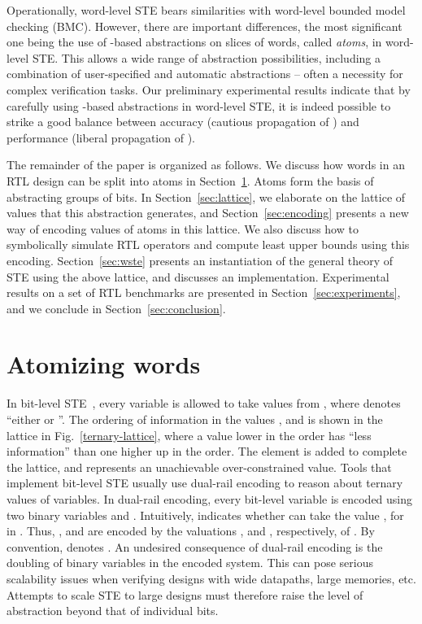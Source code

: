 \documentclass{llncs}
\begin{document}
Operationally, word-level STE bears similarities with word-level
bounded model checking (BMC).  However, there are important
differences, the most significant one being the use of -based
abstractions on slices of words, called \emph{atoms}, in word-level
STE.  This allows a wide range of abstraction possibilities, including
a combination of user-specified and automatic abstractions -- often a
necessity for complex verification tasks.  Our preliminary
experimental results indicate that by carefully using -based
abstractions in word-level STE, it is indeed possible to strike a good
balance between accuracy (cautious propagation of ) and performance
(liberal propagation of ).

The remainder of the paper is organized as follows.  We discuss how
words in an RTL design can be split into atoms in
Section~\ref{sec:atomization}.  Atoms form the basis of abstracting
groups of bits.  In Section~\ref{sec:lattice}, we elaborate on the
lattice of values that this abstraction generates, and
Section~\ref{sec:encoding} presents a new way of encoding values of
atoms in this lattice.  We also discuss how to symbolically simulate
RTL operators and compute least upper bounds using this encoding.
Section~\ref{sec:wste} presents an instantiation of the general theory
of STE using the above lattice, and discusses an implementation.
Experimental results on a set of RTL benchmarks are presented in
Section~\ref{sec:experiments}, and we conclude in
Section~\ref{sec:conclusion}.

\section{Atomizing words}\label{sec:atomization}
In bit-level STE~\cite{BryantSeger90,SegerJOMABS05}, every variable is
allowed to take values from , where  denotes ``either
 or ''.  The ordering of information in the values ,  and
 is shown in the lattice in Fig.~\ref{ternary-lattice}, where a
value lower in the order has ``less information'' than one higher up
in the order.  The element  is added to complete the lattice,
and represents an unachievable over-constrained value.  Tools that
implement bit-level STE usually use dual-rail encoding to reason about
ternary values of variables.  In dual-rail encoding, every bit-level
variable  is encoded using two binary variables  and .
Intuitively,  indicates whether  can take the value , for
 in .  Thus, ,  and  are encoded by the
valuations ,  and , respectively, of .  By convention,  denotes .  An
undesired consequence of dual-rail encoding is the doubling of binary
variables in the encoded system.  This can pose serious scalability
issues when verifying designs with wide datapaths, large memories,
etc.  Attempts to scale STE to large designs must therefore raise the
level of abstraction beyond that of individual bits.
\end{document}
